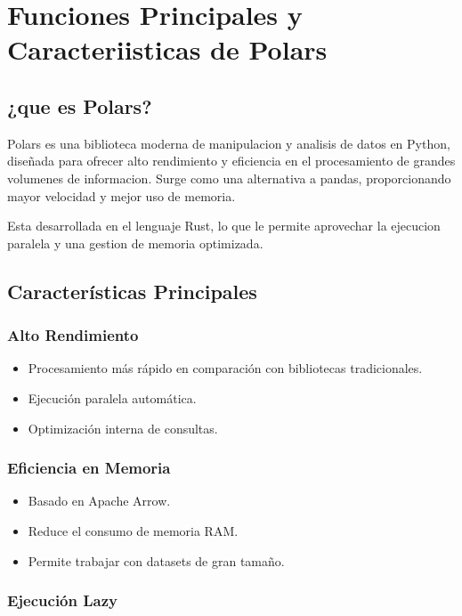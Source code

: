 \section{Funciones Principales y Caracteriisticas de Polars}

\subsection{¿que es Polars?}

Polars es una biblioteca moderna de manipulacion y analisis de datos en Python, diseñada para ofrecer alto rendimiento y eficiencia en el procesamiento de grandes volumenes de informacion. Surge como una alternativa a pandas, proporcionando mayor velocidad y mejor uso de memoria.

Esta desarrollada en el lenguaje Rust, lo que le permite aprovechar la ejecucion paralela y una gestion de memoria optimizada.

\subsection{Características Principales}

\subsubsection{Alto Rendimiento}

\begin{itemize}
    \item Procesamiento más rápido en comparación con bibliotecas tradicionales.
    \item Ejecución paralela automática.
    \item Optimización interna de consultas.
\end{itemize}

\subsubsection{Eficiencia en Memoria}

\begin{itemize}
    \item Basado en Apache Arrow.
    \item Reduce el consumo de memoria RAM.
    \item Permite trabajar con datasets de gran tamaño.
\end{itemize}

\subsubsection{Ejecución Lazy}

